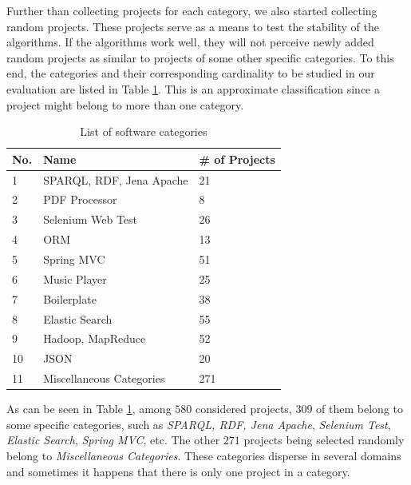 Further than collecting projects for each category, we also started collecting random projects. These projects serve as a means to test the stability of the algorithms. If the algorithms work well, they will not perceive newly added random projects as similar to projects of some other specific categories. To this end, the categories and their corresponding cardinality to be studied in our evaluation are listed in Table \ref{tab:Categories}. This is an approximate classification since a project might belong to more than one category.

\begin{table}[h!]
	\small
	\centering
	\begin{tabular}{|p{0.80cm}|p{5.00cm}|p{2.30cm}|}  \hline
		{\bf No.} & {\bf Name} & {\bf \# of Projects} \\  \hline
		1 & SPARQL, RDF, Jena Apache & 21 \\  \hline
		2 & PDF Processor & 8  \\  \hline
		3 & Selenium Web Test & 26  \\  \hline
		4 & ORM & 13  \\  \hline
		5 & Spring MVC & 51  \\  \hline
		6 & Music Player & 25  \\  \hline
		7 & Boilerplate & 38  \\  \hline
		8 & Elastic Search & 55  \\  \hline
		9 & Hadoop, MapReduce & 52  \\  \hline
		10 & JSON & 20  \\  \hline
		11 & Miscellaneous Categories & 271  \\  \hline
	\end{tabular}
	\caption[List of software categories]{List of software categories}
	\label{tab:Categories}
\end{table}

As can be seen in Table \ref{tab:Categories}, among $580$ considered projects, $309$ of them belong to some specific categories, such as \emph{SPARQL, RDF, Jena Apache}, \emph{Selenium Test}, \emph{Elastic Search}, \emph{Spring MVC}, etc. The other $271$ projects being selected randomly belong to \emph{Miscellaneous Categories}. These categories disperse in several domains and sometimes it happens that there is only one project in a category. %



